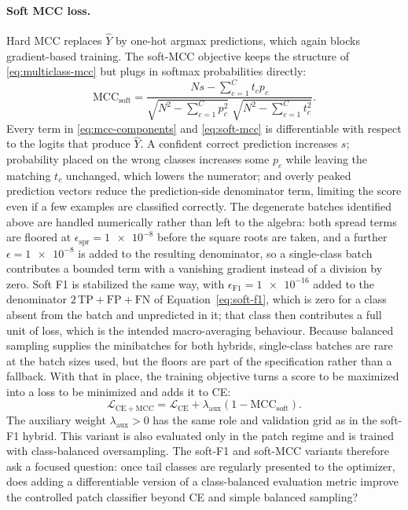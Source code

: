 \documentclass[11pt]{article}
\begin{document}
\paragraph{Soft MCC loss.}
Hard MCC replaces $\widehat{Y}$ by one-hot argmax predictions, which again blocks gradient-based training. The soft-MCC objective keeps the structure of \eqref{eq:multiclass-mcc} but plugs in softmax probabilities directly:
\begin{equation}
  \mathrm{MCC}_{\mathrm{soft}} =
  \frac{Ns - \sum_{c=1}^{C} t_c p_c}
       {\sqrt{N^2 - \sum_{c=1}^{C} p_c^2}\;
        \sqrt{N^2 - \sum_{c=1}^{C} t_c^2}}.
  \label{eq:soft-mcc}
\end{equation}
\noindent Every term in \eqref{eq:mcc-components} and \eqref{eq:soft-mcc} is differentiable with respect to the logits that produce $\widehat{Y}$. A confident correct prediction increases $s$; probability placed on the wrong classes increases some $p_c$ while leaving the matching $t_c$ unchanged, which lowers the numerator; and overly peaked prediction vectors reduce the prediction-side denominator term, limiting the score even if a few examples are classified correctly. The degenerate batches identified above are handled numerically rather than left to the algebra: both spread terms are floored at $\epsilon_{\mathrm{spr}}=\num{1e-8}$ before the square roots are taken, and a further $\epsilon=\num{1e-8}$ is added to the resulting denominator, so a single-class batch contributes a bounded term with a vanishing gradient instead of a division by zero. Soft F1 is stabilized the same way, with $\epsilon_{\mathrm{F1}}=\num{1e-16}$ added to the denominator $2\,\mathrm{TP}+\mathrm{FP}+\mathrm{FN}$ of Equation~\eqref{eq:soft-f1}, which is zero for a class absent from the batch and unpredicted in it; that class then contributes a full unit of loss, which is the intended macro-averaging behaviour. Because balanced sampling supplies the minibatches for both hybrids, single-class batches are rare at the batch sizes used, but the floors are part of the specification rather than a fallback. With that in place, the training objective turns a score to be maximized into a loss to be minimized and adds it to CE:
\begin{equation}
  \mathcal{L}_{\mathrm{CE+MCC}} =
  \mathcal{L}_{\mathrm{CE}} + \lambda_{\mathrm{aux}}
  \left(1-\mathrm{MCC}_{\mathrm{soft}}\right).
  \label{eq:ce-soft-mcc}
\end{equation}
\noindent The auxiliary weight $\lambda_{\mathrm{aux}}>0$ has the same role and validation grid as in the soft-F1 hybrid. This variant is also evaluated only in the patch regime and is trained with class-balanced oversampling. The soft-F1 and soft-MCC variants therefore ask a focused question: once tail classes are regularly presented to the optimizer, does adding a differentiable version of a class-balanced evaluation metric improve the controlled patch classifier beyond CE and simple balanced sampling?
\end{document}
